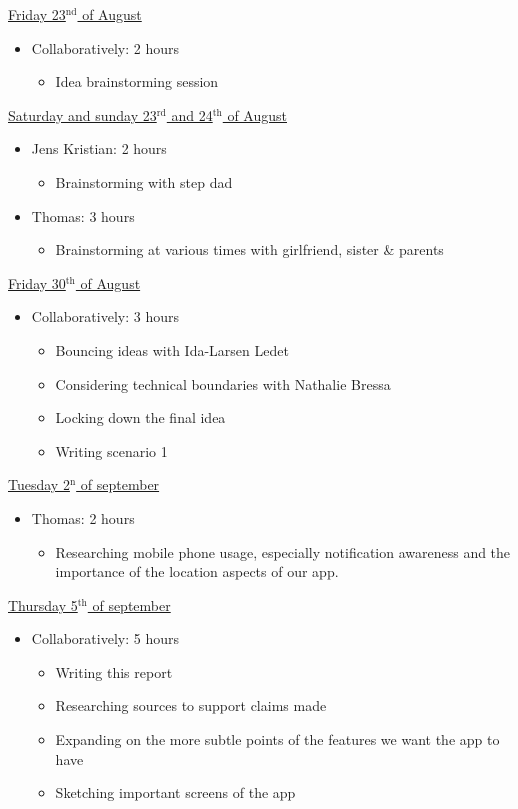 \documentclass{article}
\begin{document}
\underline{Friday 23$^{\text{nd}}$ of August}
\begin{itemize}
    \item Collaboratively: 2 hours
    \begin{itemize}
        \item Idea brainstorming session
    \end{itemize}
\end{itemize}
\underline{Saturday and sunday 23$^{\text{rd}}$ and 24$^{\text{th}}$ of August}
\begin{itemize}
    \item Jens Kristian: 2 hours
    \begin{itemize}
        \item Brainstorming with step dad
    \end{itemize}
    \item Thomas: 3 hours
    \begin{itemize}
        \item Brainstorming at various times with girlfriend, sister \& parents
    \end{itemize}
\end{itemize}
\underline{Friday 30$^{\text{th}}$ of August}
\begin{itemize}
    \item Collaboratively: 3 hours
    \begin{itemize}
        \item Bouncing ideas with Ida-Larsen Ledet
        \item Considering technical boundaries with Nathalie Bressa
        \item Locking down the final idea
        \item Writing scenario 1
    \end{itemize}
\end{itemize}
\underline{Tuesday 2$^{\text{n}}$ of september}
\begin{itemize}
    \item Thomas: 2 hours
    \begin{itemize}
        \item Researching mobile phone usage, especially notification awareness and the importance of the location aspects of our app.
    \end{itemize}
\end{itemize}
\underline{Thursday 5$^{\text{th}}$ of september}
\begin{itemize}
    \item Collaboratively: 5 hours
        \begin{itemize}
            \item Writing this report
            \item Researching sources to support claims made
            \item Expanding on the more subtle points of the features we want the app to have
            \item Sketching important screens of the app
        \end{itemize}
\end{itemize}
\end{document}
